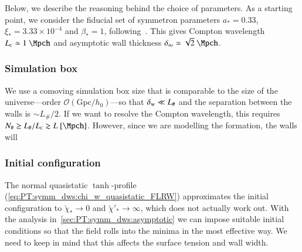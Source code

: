 Below, we describe the reasoning behind the choice of parameters. As a starting point, we consider the fiducial set of symmetron parameters $a_\ast =0.33$, $\xi_\ast = 3.33\times 10^{-4}$ and $\beta_\ast = 1$, following~\citet{christiansenCosmologicalSimulationsPhase2024}. This gives Compton wavelength $L\nped{C}\simeq 1~\Mpch$ and asymptotic wall thickness $\delta_\infty \simeq \sqrt{2} ~\Mpch$.


\subsubsection{Simulation box}

    We use a comoving simulation box size that is comparable to the size of the universe---order $\mathscr{O}(\mathrm{Gpc}/h_0)$---so that $\delta_\mathrm{w}\ll L_\#$ and the separation between the walls is $\sim L_{\#}/2$. If we want to resolve the Compton wavelength, this requires $N_\# \geq L_\#/L\nped{C} \gtrsim L~[\Mpch]$. However, since we are modelling the formation, the walls will \blahblah




\subsubsection{Initial configuration}

    The normal quasistatic $\tanh$-profile (\cref{eq:PT:symm_dws:chi_w_quasistatic_FLRW}) approximates the initial configuration to $\breve{\chi}_\ast\to0$ and $\breve{\chi}'_\ast \to \infty$, which does not actually work out. With the analysis in~\cref{sec:PT:symm_dws:asymptotic} we can impose suitable initial conditions so that the field rolls into the minima in the most effective way. We need to keep in mind that this affects the surface tension and wall width.



